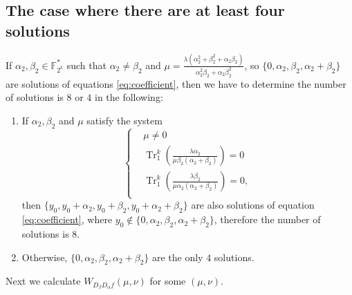 \documentclass{article}
\newcommand{\F}{\mathbb{F}}
\newcommand{\TRACE}{\operatorname{Tr}_1^k}
\theoremstyle{nonumberplain}
\newcommand{\0}{\textbf{0}}
\newcommand{\1}{\textbf{1}}
\begin{document}
    \subsection{The case where there are at least four solutions}
    If $ \alpha_2,\beta_2\in\F_{2^k}^* $ such that $ \alpha_2\ne\beta_2 $ and   
    $ \mu= \frac{\lambda(\alpha_2^2+\beta_2^2+\alpha_2\beta_2)}{\alpha_2^2\beta_2+\alpha_2\beta_2^2}$, 
    so $ \{0,\alpha_2,\beta_2,\alpha_2+\beta_2\} $ are solutions of equations \eqref{eq:coefficient}, 
    then we have to determine the number of solutions is $ 8 $ or $ 4 $ in the following:    
    \begin{enumerate}[label=\arabic{*})]
        \item If $ \alpha_2,\beta_2 $ and $ \mu $ satisfy the system 
        \begin{equation}\label{eq:last_four_solution_condition}\left\{
            \begin{alignedat}{3}
                &\mu\ne 0\\
                &\TRACE\left(\frac{\lambda\alpha_2}{\mu\beta_2(\alpha_2+\beta_2)}\right)=0\\
                &\TRACE\left(\frac{\lambda\beta_2}{\mu\alpha_2(\alpha_2+\beta_2)}\right)=0,\\
            \end{alignedat}\right.
        \end{equation}
            then $ \{y_0,y_0+\alpha_2,y_0+\beta_2,y_0+\alpha_2+\beta_2\} $ are also solutions of equation \eqref{eq:coefficient}, 
            where $ y_0\notin\{0,\alpha_2,\beta_2,\alpha_2+\beta_2\} $, 
            therefore the number of solutions is $ 8 $.
        \item Otherwise, $ \{0,\alpha_2,\beta_2,\alpha_2+\beta_2\} $ are the only $ 4 $ solutions. 
    \end{enumerate}


    Next we calculate $ W_{D_{\beta}D_{\alpha}f}(\mu,\nu) $ for some $ (\mu,\nu) $.
\end{document}

